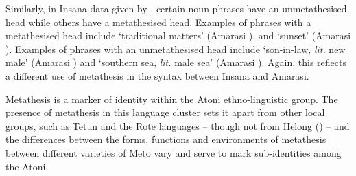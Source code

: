 Similarly, in Insana data given by \cite{scno71},
certain noun phrases have an unmetathesised head
while others have a metathesised head.
Examples of phrases with a metathesised head include
 `traditional matters' (Amarasi ),
and  `sunset' (Amarasi ).
Examples of phrases with an unmetathesised head include  `son-in-law,
\emph{lit.} new male' (Amarasi ) and
 `southern sea, \emph{lit.} male sea' (Amarasi ).
Again, this reflects a different use of metathesis in the syntax
between Insana and Amarasi.

Metathesis is a marker of identity within the Atoni ethno-linguistic group.
The presence of metathesis in this language cluster
sets it apart from other local groups, such as Tetun and the Rote languages
-- though not from Helong () --
and the differences between the forms, functions and environments
of metathesis between different varieties of Meto
vary and serve to mark sub-identities among the Atoni.